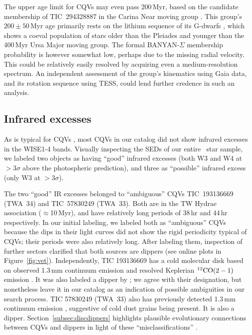 \documentclass[11pt,twocolumn,tighten]{aastex63}
\begin{document}

The upper age limit for CQVs may even pass 200\,Myr, based on the
candidate membership of TIC~294328887 in the Carina Near moving group
\citep{2006ApJ...649L.115Z}.  This group's $200 \pm 50$\,Myr age
primarily rests on the lithium sequence of its G-dwarfs
\citep{2006ApJ...649L.115Z}, which shows a coeval population of stars
older than the Pleiades and younger than the 400\,Myr Ursa Major
moving group.  The formal BANYAN-$\Sigma$ membership probability is
however somewhat low, perhaps due to the missing radial velocity.
This could be relatively easily resolved by acquiring even a
medium-resolution spectrum.  An independent assessment of the group's
kinematics using Gaia data, and its rotation sequence using TESS,
could lend further credence in such an analysis.


\subsection{Infrared excesses}
\label{subsec:irexcess}

As is typical for CQVs \citep{2017AJ....153..152S}, most CQVs in our
catalog did not show infrared excesses in the WISE1-4 bands.  Visually
inspecting the SEDs of our entire \ncpvsfound\ star sample, we labeled
two objects as having ``good'' infrared excesses (both W3 and W4 at
$>$3$\sigma$ above the photospheric prediction), and three as
``possible'' infrared excess (only W3 at $>$3$\sigma$).

The two ``good'' IR excesses belonged to ``ambiguous'' CQVs
TIC~193136669 (TWA~34) and TIC~57830249 (TWA~33).  Both are in the TW
Hydrae association ($\approx$10\,Myr), and have relatively long
periods of 38\,hr and 44\,hr respectively.  In our initial labeling,
we labeled both as ``ambiguous'' CQVs because the dips in their light
curves did not show the rigid periodicity typical of CQVs;  their
periods were also relatively long.  After labeling them, inspection of
further sectors clarified that both sources are dippers (see online
plots in Figure~\ref{fig:vet}).  Independently, TIC 193136669 has a
cold molecular disk based on observed 1.3\,mm continuum emission and
resolved Keplerian $^{12}{\rm CO}(2-1)$ emission
\citep{2015A&A...582L...5R}.  It was also labeled a dipper by
\citet{2022ApJS..263...14C}; we agree with their designation, but
nonetheless leave it in our catalog as an indication of possible
ambiguities in our search process.  TIC 57830249 (TWA~33) also has
previously detected 1.3\,mm continuum emission
\citep{2015A&A...582L...5R}, suggestive of cold dust grains being
present.  It is also a dipper.  Section~\ref{subsec:discdippers}
highlights plausible evolutionary connections between CQVs and dippers
in light of these ``misclassifications'' .
\end{document}
